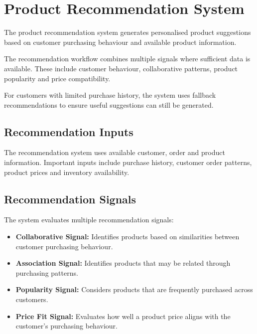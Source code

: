 \documentclass[12pt,a4paper]{report}
\begin{document}

\section{Product Recommendation System}

The product recommendation system generates personalised product
suggestions based on customer purchasing behaviour and available
product information.

The recommendation workflow combines multiple signals where sufficient
data is available. These include customer behaviour, collaborative
patterns, product popularity and price compatibility.

For customers with limited purchase history, the system uses fallback
recommendations to ensure useful suggestions can still be generated.

\subsection{Recommendation Inputs}

The recommendation system uses available customer, order and product
information. Important inputs include purchase history, customer order
patterns, product prices and inventory availability.

\subsection{Recommendation Signals}

The system evaluates multiple recommendation signals:

\begin{itemize}
    \item \textbf{Collaborative Signal:} Identifies products based on
    similarities between customer purchasing behaviour.

    \item \textbf{Association Signal:} Identifies products that may be
    related through purchasing patterns.

    \item \textbf{Popularity Signal:} Considers products that are
    frequently purchased across customers.

    \item \textbf{Price Fit Signal:} Evaluates how well a product price
    aligns with the customer's purchasing behaviour.
\end{itemize}
\end{document}
